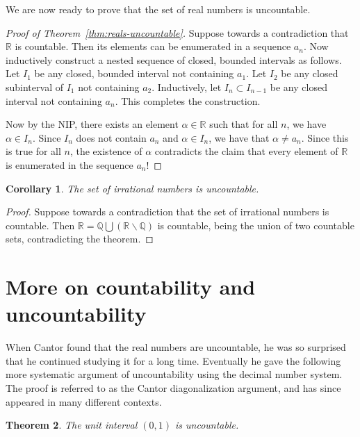 \documentclass[11pt,oneside]{amsbook}
\newcommand{\QQ}{\mathbb Q}
\newcommand{\RR}{\mathbb R}
\theoremstyle{definition}
\theoremstyle{plain}
\newtheorem{thm}{Theorem}[section]
\newtheorem{cor}[thm]{Corollary}
\theoremstyle{definition}
\theoremstyle{remark}
\numberwithin{equation}{section}
\numberwithin{figure}{section}
\begin{document}
We are now ready to prove that the set of real numbers is uncountable.

\begin{proof}[Proof of Theorem~\ref{thm:reals-uncountable}]
  Suppose towards a contradiction that $\RR$ is countable. Then its elements can be enumerated in a sequence $a_n$. Now inductively construct a nested sequence of closed, bounded intervals as follows. Let $I_1$ be any closed, bounded interval not containing $a_1$. Let $I_2$ be any closed subinterval of $I_1$ not containing $a_2$. Inductively, let $I_n\subset I_{n-1}$ be any closed interval not containing $a_n$. This completes the construction.

  Now by the NIP, there exists an element $\alpha\in\RR$ such that for all $n$, we have $\alpha\in I_n$. Since $I_n$ does not contain $a_n$ and $\alpha\in I_n$, we have that $\alpha\neq a_n$. Since this is true for all $n$, the existence of $\alpha$ contradicts the claim that every element of $\RR$ is enumerated in the sequence $a_n$!
\end{proof}

\begin{cor}
  The set of irrational numbers is uncountable.
\end{cor}

\begin{proof}
  Suppose towards a contradiction that the set of irrational numbers is countable. Then $\RR=\QQ\bigcup(\RR\smallsetminus\QQ)$ is countable, being the union of two countable sets, contradicting the theorem.
\end{proof}

\newpage
\section{More on countability and uncountability}

When Cantor found that the real numbers are uncountable, he was so surprised that he continued studying it for a long time. Eventually he gave the following more systematic argument of uncountability using the decimal number system. The proof is referred to as the Cantor diagonalization argument, and has since appeared in many different contexts.

\begin{thm}
  The unit interval $(0,1)$ is uncountable.
\end{thm}
\end{document}
